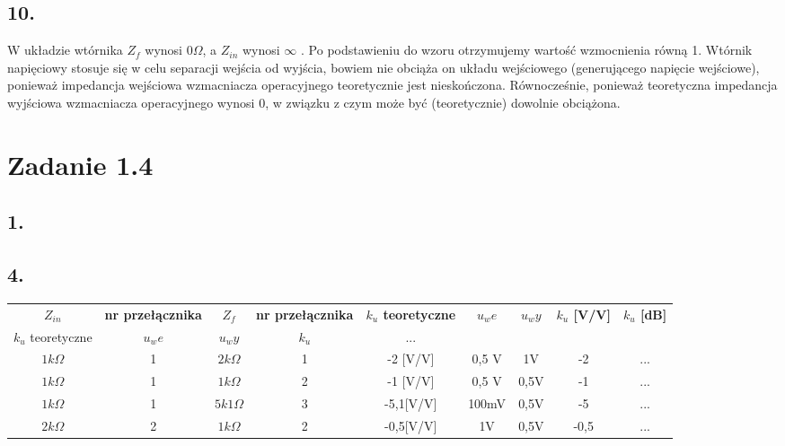\documentclass[polish,a4paper]{article}
\begin{document}
\subsection*{10.}
W układzie wtórnika $Z_f$ wynosi $0\Omega$, a $Z_{in}$ wynosi $\infty$ . Po podstawieniu do wzoru otrzymujemy wartość wzmocnienia równą 1. Wtórnik napięciowy stosuje się w celu separacji wejścia od wyjścia, bowiem nie obciąża on układu wejściowego (generującego napięcie wejściowe), ponieważ impedancja wejściowa wzmacniacza operacyjnego teoretycznie jest nieskończona. Równocześnie, ponieważ teoretyczna impedancja wyjściowa wzmacniacza operacyjnego wynosi 0, w związku z czym może być (teoretycznie) dowolnie obciążona.

\section{Zadanie 1.4}

\subsection*{1.}

\subsection*{4.}

\begin{center}
\begin{tabular}{|c|c|c|c||c|c|c|c|c|}
\hline
\textbf{$Z_{in}$} & \textbf{nr przełącznika} & \textbf{$Z_f$} & \textbf{nr przełącznika} & \textbf{$k_u$ teoretyczne } & \textbf{$u_we$} & \textbf{$u_wy$} & \textbf{$k_u$ [V/V]} & \textbf{$k_u$ [dB] } \\ 
\hhline{|=|=|=|=#=|=|=|=|=|}
$k_u$ teoretyczne & $u_we$ & $u_wy$ & $k_u$ & ...\\ %
$1k\Omega$ & 1 & $2k\Omega$ & 1 & -2 [V/V] & 0,5 V & 1V & -2 & ...\\
\hline
$1k\Omega$ & 1 & $1k\Omega$ & 2 & -1 [V/V] & 0,5 V & 0,5V & -1 & ...\\
\hline
$1k\Omega$ & 1 & $5k1\Omega$ & 3 & -5,1[V/V] & 100mV & 0,5V & -5 & ...\\
\hline
$2k\Omega$ & 2 & $1k\Omega$ & 2 & -0,5[V/V] & 1V & 0,5V & -0,5 & ...\\
\hline

\end{tabular}
\end{center}
\end{document}
